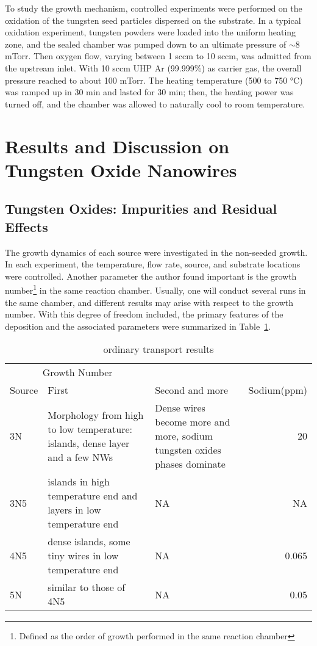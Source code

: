To study the growth mechanism, controlled experiments were performed on the oxidation of the tungsten seed particles dispersed on the substrate. In a typical oxidation experiment, tungsten powders were loaded into the uniform heating zone, and the sealed chamber was pumped down to an ultimate pressure of $\sim8$ mTorr. Then oxygen flow, varying between 1 sccm to 10 sccm, was admitted from the upstream inlet. With 10 sccm UHP Ar (99.999\%) as carrier gas, the overall pressure reached to about 100 mTorr. The heating temperature (500 to 750 \si{\degreeCelsius}) was ramped up in 30 min and lasted for 30 min; then, the heating power was turned off, and the chamber was allowed to naturally cool to room temperature.

\section{Results and Discussion on Tungsten Oxide Nanowires}
\subsection{Tungsten Oxides: Impurities and Residual Effects}\label{sec:nawox}

The growth dynamics of each source were investigated in the non-seeded growth. In each experiment, the temperature, flow rate, source, and substrate locations were controlled. Another parameter the author found important is the growth number\footnote{Defined as the order of growth performed in the same reaction chamber} in the same reaction chamber. Usually, one will conduct several runs in the same chamber, and different results may arise with respect to the growth number. With this degree of freedom included, the primary features of the deposition and the associated parameters were summarized in Table~\ref{tab:wot}.
\begin{table}[htb]
\centering
\caption{ ordinary transport results}\label{tab:wot}
\begin{tabular}{lp{2in}p{2in}r}
\toprule
\multicolumn{2}{c}{Growth Number} \\
\cmidrule(l){2-3}
 Source   & First & Second and more & Sodium(ppm)   \\
\midrule
3N      & Morphology from high to low temperature: islands, dense layer and a few NWs & Dense wires become more and more, sodium tungsten oxides phases dominate & 20  \\
3N5     & islands in high temperature end and layers in low temperature end & NA &      NA\\
4N5     & dense islands, some tiny wires in low temperature end & NA & 0.065 \\
5N      & similar to those of 4N5  & NA & 0.05\\
\bottomrule
\end{tabular}
\end{table}

